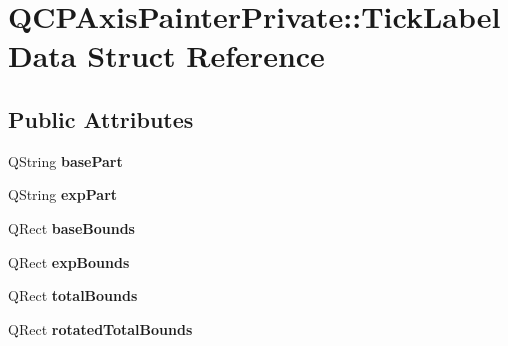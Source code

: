 \hypertarget{struct_q_c_p_axis_painter_private_1_1_tick_label_data}{}\section{Q\+C\+P\+Axis\+Painter\+Private\+:\+:Tick\+Label\+Data Struct Reference}
\label{struct_q_c_p_axis_painter_private_1_1_tick_label_data}
\subsection*{Public Attributes}
\begin{DoxyCompactItemize}
\item 
Q\+String {\bfseries base\+Part}\hypertarget{struct_q_c_p_axis_painter_private_1_1_tick_label_data_ad65b76a5cafc412179a20b5d79809fc4}{}\label{struct_q_c_p_axis_painter_private_1_1_tick_label_data_ad65b76a5cafc412179a20b5d79809fc4}

\item 
Q\+String {\bfseries exp\+Part}\hypertarget{struct_q_c_p_axis_painter_private_1_1_tick_label_data_a09692e4ea092137278b4ac051d5fdf2b}{}\label{struct_q_c_p_axis_painter_private_1_1_tick_label_data_a09692e4ea092137278b4ac051d5fdf2b}

\item 
Q\+Rect {\bfseries base\+Bounds}\hypertarget{struct_q_c_p_axis_painter_private_1_1_tick_label_data_aac1047ae6ab8e9f5a42923082aabfff5}{}\label{struct_q_c_p_axis_painter_private_1_1_tick_label_data_aac1047ae6ab8e9f5a42923082aabfff5}

\item 
Q\+Rect {\bfseries exp\+Bounds}\hypertarget{struct_q_c_p_axis_painter_private_1_1_tick_label_data_a6722d2bcefb93011e9dc42301b966846}{}\label{struct_q_c_p_axis_painter_private_1_1_tick_label_data_a6722d2bcefb93011e9dc42301b966846}

\item 
Q\+Rect {\bfseries total\+Bounds}\hypertarget{struct_q_c_p_axis_painter_private_1_1_tick_label_data_afbb3163cf4c628914f1b703945419ea5}{}\label{struct_q_c_p_axis_painter_private_1_1_tick_label_data_afbb3163cf4c628914f1b703945419ea5}

\item 
Q\+Rect {\bfseries rotated\+Total\+Bounds}\hypertarget{struct_q_c_p_axis_painter_private_1_1_tick_label_data_aa4d38c5ea47c9184a78ee33ae7f1012e}{}\label{struct_q_c_p_axis_painter_private_1_1_tick_label_data_aa4d38c5ea47c9184a78ee33ae7f1012e}


\end{DoxyCompactItemize}
